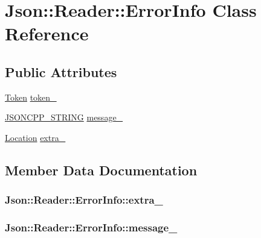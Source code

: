 \hypertarget{classJson_1_1Reader_1_1ErrorInfo}{}\section{Json\+:\+:Reader\+:\+:Error\+Info Class Reference}
\label{classJson_1_1Reader_1_1ErrorInfo}
\subsection*{Public Attributes}
\begin{DoxyCompactItemize}
\item 
\hyperlink{classJson_1_1Reader_1_1Token}{Token} \hyperlink{classJson_1_1Reader_1_1ErrorInfo_a52e1c71b12eb1c3f0395d7ef1e778ce6}{token\+\_\+}
\item 
\hyperlink{json_8hpp_a1e723f95759de062585bc4a8fd3fa4be}{J\+S\+O\+N\+C\+P\+P\+\_\+\+S\+T\+R\+I\+NG} \hyperlink{classJson_1_1Reader_1_1ErrorInfo_a3529d420f7c83165565bf294a5d6ed13}{message\+\_\+}
\item 
\hyperlink{classJson_1_1Reader_a46795b5b272bf79a7730e406cb96375a}{Location} \hyperlink{classJson_1_1Reader_1_1ErrorInfo_af92c24acf642b040d6e40aac4952d44d}{extra\+\_\+}
\end{DoxyCompactItemize}


\subsection{Member Data Documentation}
\subsubsection[{\texorpdfstring{extra\+\_\+}{extra_}}]{ Json\+::\+Reader\+::\+Error\+Info\+::extra\+\_\+}\hypertarget{classJson_1_1Reader_1_1ErrorInfo_af92c24acf642b040d6e40aac4952d44d}{}\label{classJson_1_1Reader_1_1ErrorInfo_af92c24acf642b040d6e40aac4952d44d}
\subsubsection[{\texorpdfstring{message\+\_\+}{message_}}]{ Json\+::\+Reader\+::\+Error\+Info\+::message\+\_\+}\hypertarget{classJson_1_1Reader_1_1ErrorInfo_a3529d420f7c83165565bf294a5d6ed13}{}\label{classJson_1_1Reader_1_1ErrorInfo_a3529d420f7c83165565bf294a5d6ed13}
